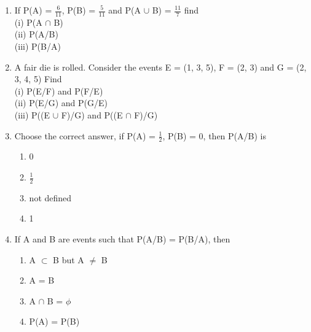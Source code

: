 \begin{enumerate}[label=\thesection.\arabic*.,ref=\thesection.\theenumi]
\item If P(A) = $\frac{6}{11}$, P(B) = $\frac{5}{11}$ and P(A $\cup$ B) = $\frac{11}{7}$ find\\
(i) P(A $\cap$ B)\\ 
(ii) P(A/B)\\ 
(iii) P(B/A)
\\
\solution 

\item A fair die is rolled. Consider the events E =  (1, 3, 5), F = (2, 3) and G = (2, 3, 4, 5) Find\\
(i) P(E/F) and P(F/E) \\
(ii) P(E/G) and P(G/E)\\
(iii) P((E $\cup$ F)/G) and P((E $\cap$ F)/G)\\
\solution

\item Choose the correct answer, if P(A) = $\frac{1}{2}$, P(B) = 0, then P(A/B) is
\begin{enumerate}
\item 0
\item $\frac{1}{2}$
\item not defined
\item 1
\end{enumerate}
\solution


\item If A and B are events such that P(A/B) = P(B/A), then
\begin{enumerate}
\item A $\subset$ B but A $\neq$ B
\item A = B
\item A $\cap$ B = $\phi$
\item P(A) = P(B)
\end{enumerate}
\solution



\end{enumerate}
